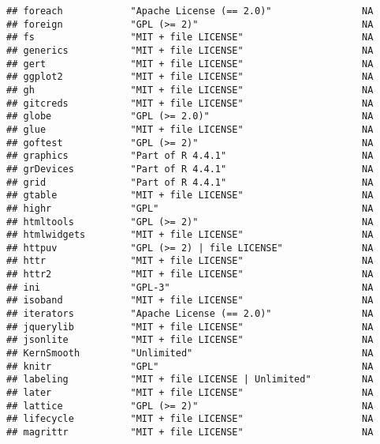\documentclass[
]{article}
\begin{document}
\begin{verbatim}
## foreach            "Apache License (== 2.0)"                NA             
## foreign            "GPL (>= 2)"                             NA             
## fs                 "MIT + file LICENSE"                     NA             
## generics           "MIT + file LICENSE"                     NA             
## gert               "MIT + file LICENSE"                     NA             
## ggplot2            "MIT + file LICENSE"                     NA             
## gh                 "MIT + file LICENSE"                     NA             
## gitcreds           "MIT + file LICENSE"                     NA             
## globe              "GPL (>= 2.0)"                           NA             
## glue               "MIT + file LICENSE"                     NA             
## goftest            "GPL (>= 2)"                             NA             
## graphics           "Part of R 4.4.1"                        NA             
## grDevices          "Part of R 4.4.1"                        NA             
## grid               "Part of R 4.4.1"                        NA             
## gtable             "MIT + file LICENSE"                     NA             
## highr              "GPL"                                    NA             
## htmltools          "GPL (>= 2)"                             NA             
## htmlwidgets        "MIT + file LICENSE"                     NA             
## httpuv             "GPL (>= 2) | file LICENSE"              NA             
## httr               "MIT + file LICENSE"                     NA             
## httr2              "MIT + file LICENSE"                     NA             
## ini                "GPL-3"                                  NA             
## isoband            "MIT + file LICENSE"                     NA             
## iterators          "Apache License (== 2.0)"                NA             
## jquerylib          "MIT + file LICENSE"                     NA             
## jsonlite           "MIT + file LICENSE"                     NA             
## KernSmooth         "Unlimited"                              NA             
## knitr              "GPL"                                    NA             
## labeling           "MIT + file LICENSE | Unlimited"         NA             
## later              "MIT + file LICENSE"                     NA             
## lattice            "GPL (>= 2)"                             NA             
## lifecycle          "MIT + file LICENSE"                     NA             
## magrittr           "MIT + file LICENSE"                     NA             

\end{verbatim}
\end{document}
